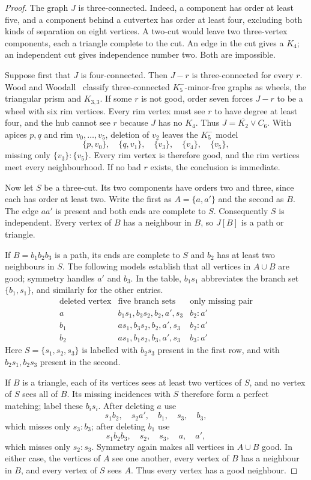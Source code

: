 \begin{proof}
The graph $J$ is three-connected.  Indeed, a component has order at least
five, and a component behind a cutvertex has order at least four, excluding
both kinds of separation on eight vertices.  A two-cut would leave two
three-vertex components, each a triangle complete to the cut.  An edge in
the cut gives a $K_4$; an independent cut gives independence number two.
Both are impossible.

Suppose first that $J$ is four-connected.  Then $J-r$ is three-connected
for every $r$.  Wood and Woodall~\cite[Lemma~4.2.1]{WoodWoodall2009}
classify three-connected $K_5^{-}$-minor-free graphs as wheels, the
triangular prism and $K_{3,3}$.  If some $r$ is not good, order seven
forces $J-r$ to be a wheel with six rim vertices.  Every rim vertex must
see $r$ to have degree at least four, and the hub cannot see $r$ because
$J$ has no $K_4$.  Thus $J=\overline{K_2}\vee C_6$.  With apices $p,q$
and rim $v_0,\ldots,v_5$, deletion of $v_2$ leaves the $K_5^{-}$ model
\[
       \{p,v_0\},\quad\{q,v_1\},\quad\{v_3\},
       \quad\{v_4\},\quad\{v_5\},
\]
missing only $\{v_3\}:\{v_5\}$.  Every rim vertex is therefore good,
and the rim vertices meet every neighbourhood.  If no bad $r$ exists,
the conclusion is immediate.

Now let $S$ be a three-cut.  Its two components have orders two and three,
since each has order at least two.  Write the first as $A=\{a,a'\}$ and
the second as $B$.  The edge $aa'$ is present and both ends are complete
to $S$.  Consequently $S$ is independent.  Every vertex of $B$ has a
neighbour in $B$, so $J[B]$ is a path or triangle.

If $B=b_1b_2b_3$ is a path, its ends are complete to $S$ and $b_2$ has at
least two neighbours in $S$.  The following models establish that all
vertices in $A\cup B$ are good; symmetry handles $a'$ and $b_3$.
In the table, $b_1s_1$ abbreviates the branch set $\{b_1,s_1\}$, and
similarly for the other entries.
\[
\begin{array}{c|c|c}
\text{deleted vertex}&\text{five branch sets}&\text{only missing pair}\\\hline
a&b_1s_1,b_3s_2,b_2,a',s_3&b_2:a'\\
b_1&as_1,b_3s_2,b_2,a',s_3&b_2:a'\\
b_2&as_1,b_1s_2,b_3,a',s_3&b_3:a'
\end{array}
\]
Here $S=\{s_1,s_2,s_3\}$ is labelled with $b_2s_3$ present in the first
row, and with $b_2s_1,b_2s_3$ present in the second.

If $B$ is a triangle, each of its vertices sees at least two vertices of
$S$, and no vertex of $S$ sees all of $B$.  Its missing incidences with
$S$ therefore form a perfect matching; label these $b_is_i$.
After deleting $a$ use
\[
       s_1b_2,\quad s_2a',\quad b_1,\quad s_3,\quad b_3,
\]
which misses only $s_3:b_3$; after deleting $b_1$ use
\[
       s_1b_2b_3,\quad s_2,\quad s_3,\quad a,\quad a',
\]
which misses only $s_2:s_3$.  Symmetry again makes all vertices in
$A\cup B$ good.  In either case, the vertices of $A$ see one another,
every vertex of $B$ has a neighbour in $B$, and every vertex of $S$ sees
$A$.  Thus every vertex has a good neighbour.
\end{proof}


